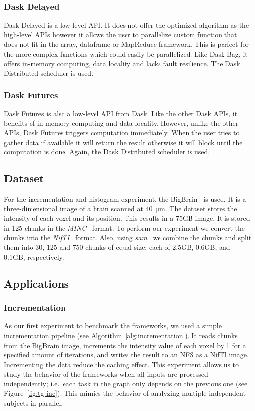 \documentclass[conference]{IEEEtran}
\begin{document}
\subsubsection{Dask Delayed~\cite{dask-delayed}} Dask Delayed is a low-level API. It
does not offer the optimized algorithm as the high-level APIs however it allows the
user to parallelize custom function that does not fit in the array, dataframe or
MapReduce framework. This is perfect for the more complex functions which could
easily be parallelized. Like Dask Bag, it offers in-memory computing, data locality
and lacks fault resilience. The Dask Distributed scheduler is used.

\subsubsection{Dask Futures~\cite{dask-futures}} Dask Futures is also a low-level API
from Dask. Like the other Dask APIs, it benefits of in-memory computing and data
locality. However, unlike the other APIs, Dask Futures triggers computation
immediately. When the user tries to gather data if available it will return the
result otherwise it will block until the computation is done. Again, the Dask
Distributed scheduler is used.


\subsection{Dataset}
For the incrementation and histogram experiment, the BigBrain~\cite{Amunts:13} is
used. It is a three-dimensional image of a brain scanned at \SI{40}{\micro\metre}.
The dataset stores the intensity of each voxel and its position. This results in a
75GB image. It is stored in 125 chunks in the \textit{MINC}~\cite{minc} format. To
perform our experiment we convert the chunks into the \textit{NifTI}~\cite{nifti}
format. Also, using \textit{sam}~\cite{sam} we combine the chunks and split them into
30, 125 and 750 chunks of equal size; each of 2.5GB, 0.6GB, and 0.1GB, respectively.

\subsection{Applications}
\subsubsection{\textbf{Incrementation}}
As our first experiment to benchmark the frameworks, we used a simple incrementation
pipeline (see Algorithm~\ref{alg:incrementation}). It reads chunks from the BigBrain
image, increments the intensity value of each voxel by 1 for a specified amount of
iterations, and writes the result to an NFS as a NifTI image. Incrementing the data
reduce the caching effect. This experiment allows us to study the behavior of the
frameworks when all inputs are processed independently; i.e.\ each task in the graph
only depends on the previous one (see Figure~\ref{fig:tg-inc}). This mimics the
behavior of analyzing multiple independent subjects in parallel.
\end{document}
